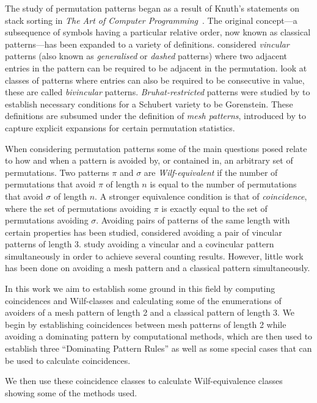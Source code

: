 The study of permutation patterns began as a result of Knuth's statements on
stack sorting in \emph{The Art of Computer Programming}~\cite[p.~243,
Ex.~5,6]{Knuth:1997:ACP:260999}. The original concept---a subsequence of symbols
having a particular relative order, now known as classical patterns---has been
expanded to a variety of definitions. \textcite{babstein2000} considered
\emph{vincular} patterns (also known as \emph{generalised} or \emph{dashed}
patterns) where two adjacent entries in the pattern can be required to be
adjacent in the permutation. \textcite{MR2652101} look at classes of patterns
where entries can also be required to be consecutive in value, these are called
\emph{bivincular} patterns. \emph{Bruhat-restricted} patterns were studied by
\textcite{MR2264071} to establish necessary conditions for a Schubert variety to
be Gorenstein. These definitions are subsumed under the definition of \emph{mesh
patterns}, introduced by \textcite{journals/combinatorics/BrandenC11} to capture
explicit expansions for certain permutation statistics.

When considering permutation patterns some of the main questions posed relate to
how and when a pattern is avoided by, or contained in, an arbitrary set of
permutations. Two patterns \(\pi\) and \(\sigma\) are \emph{Wilf-equivalent} if
the number of permutations that avoid \(\pi\) of length \(n\) is equal to the
number of permutations that avoid \(\sigma\) of length \(n\). A stronger
equivalence condition is that of \emph{coincidence}, where the set of
permutations avoiding \(\pi\) is exactly equal to the set of permutations
avoiding \(\sigma\). Avoiding pairs of patterns of the same length with certain
properties has been studied, \textcite{MR2178749} considered avoiding a pair of
vincular patterns of length 3. \textcite{2015arXiv151203226B} study avoiding a
vincular and a covincular pattern simultaneously in order to achieve several
counting results. However, little work has been done on avoiding a mesh pattern
and a classical pattern simultaneously.

In this work we aim to establish some ground in this field by computing
coincidences and Wilf-classes and calculating some of the enumerations of
avoiders of a mesh pattern of length 2 and a classical pattern of length 3. We
begin by establishing coincidences between mesh patterns of length 2 while
avoiding a dominating pattern by computational methods, which are then used to
establish three ``Dominating Pattern Rules'' as well as some special cases that
can be used to calculate coincidences.

 We then use these coincidence classes to calculate Wilf-equivalence classes
 showing some of the methods used.
